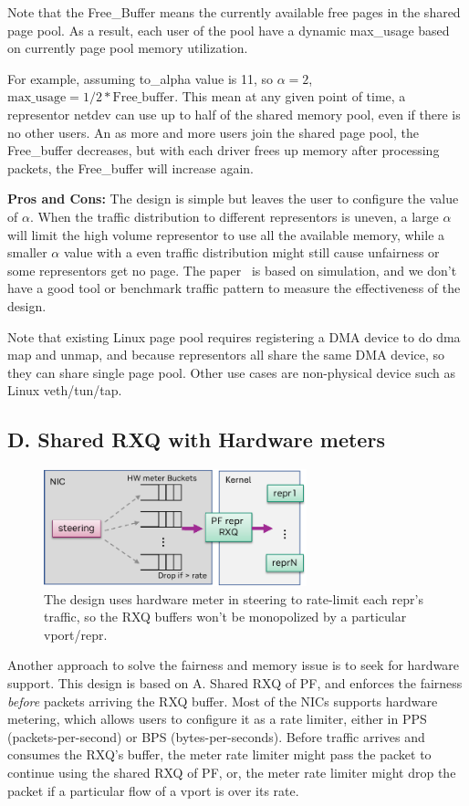 \documentclass[letterpaper]{article}
\begin{document}
Note that the Free\_Buffer means the currently available free pages
in the shared page pool. As a result, each user of the pool have a
dynamic max\_usage based on currently page pool memory utilization.

For example, assuming to\_alpha value is 11, so $\alpha = 2$, $ \text{max\_usage}
= 1/2 * \text{Free\_buffer} $.
This mean at any given point of time, a representor netdev can use up to half of
the shared memory pool, even if there is no other users. An as more and more
users join the shared page pool, the Free\_buffer decreases, but with each driver
frees up memory after processing packets, the Free\_buffer will increase again.

\textbf{Pros and Cons:} The design is simple but leaves the user to configure
the value of $\alpha$. When the traffic distribution to different representors
is uneven, a large $\alpha$ will limit the high volume representor to use all
the available memory, while a smaller $\alpha$ value with a even traffic distribution
might still cause unfairness or some representors get no page.
The paper~\cite{queuelength} is based on simulation, and we don't have a good
tool or benchmark traffic pattern to measure the effectiveness of the design.

Note that existing Linux page pool requires registering a DMA device to do
dma map and unmap, and because representors all share the same DMA device,
so they can share single page pool. Other use cases are non-physical device
such as Linux veth/tun/tap.

\subsection{D. Shared RXQ with Hardware meters}
\begin{figure}[t!]
\includegraphics[width=3in]{meter.pdf}
\centering
\caption{The design uses hardware meter in steering to rate-limit each repr's traffic,
so the RXQ buffers won't be monopolized by a particular vport/repr.}
\label{fig:shared_page_pool}
\end{figure}

Another approach to solve the fairness and memory issue is to seek for hardware
support. This design is based on A. Shared RXQ of PF, and enforces the fairness
\emph{before} packets arriving the RXQ buffer.
Most of the NICs supports hardware metering, which allows users to configure it
as a rate limiter, either in PPS (packets-per-second) or BPS (bytes-per-seconds).
Before traffic arrives and consumes the RXQ's buffer, the meter rate limiter
might pass the packet to continue using the shared RXQ of PF, or, the meter
rate limiter might drop the packet if a particular flow of a vport is over
its rate.
\end{document}
